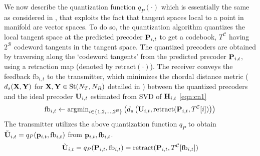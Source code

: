 \documentclass[conference]{IEEEtran}
\begin{document}
{We now describe the quantization function $q_P(\cdot)$ which is essentially the same as considered in \cite{Gupt1905:Predictive,6891198}, that exploits the fact that tangent spaces local to a point in manifold are vector spaces. To do so, the quantization algorithm quantizes the local tangent space at the predicted precoder ${\bf P}_{i,t}$ to get a codebook, $T^\mathcal{C}$ having $2^{\mathcal{B}}$ codeword tangents in the tangent space. The quantized precoders are obtained by traversing along the `codeword tangents' from the predicted precoder ${\bf P}_{i,t}$, using a retraction map (denoted by $\text{retract}(\cdot)$). The receiver conveys the feedback $\text{fb}_{i,t}$ to the transmitter, which minimizes the chordal distance metric ($d_s({\bf X},{\bf Y})$ for ${\bf X},{\bf Y} \in \text{St}(N_T,N_R)$ detailed in \cite{Gupt1905:Predictive,6891198}) between the quantized precoders and the ideal precoder ${\bf U}_{i,t}$ estimated from SVD of ${\bf H}_{i,t}$ \eqref{eqn:cn1}
 \begin{equation}
\label{eqn:cn1}
\text{fb}_{i,t} \gets \text{argmin}_{i \in \{1,2,\ldots,2^{\mathcal{B}}\}}\left (d_s\left (\bU_{i,t},\text{retract}(\bP_{i,t},T^\mathcal{C}[i])\right ) \right)
\end{equation}
The transmitter utilizes the above quantization function $q_P$ to obtain $\tilde{{\bf U}}_{i,t}=q_P({\bf p}_{i,t},\text{fb}_{i,t})$ from ${\bf p}_{i,t},\text{fb}_{i,t}$.
\begin{equation}
\tilde{\bU}_{i,t}=q_P(\bP_{i,t},\text{fb}_{i,t})=\text{retract}(\bP_{i,t},T^\mathcal{C}[\text{fb}_{i,t}])
\label{eqn:cn2}
\end{equation}

}
\end{document}
